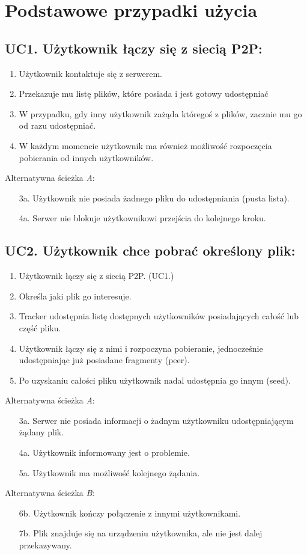 \documentclass[11pt]{article}
\begin{document}
\section{Podstawowe przypadki użycia}
\subsection{UC1. Użytkownik łączy się z siecią P2P:}
\begin{enumerate}
	\item Użytkownik kontaktuje się z serwerem.
	\item Przekazuje mu listę plików, które posiada i jest gotowy udostępniać
	\item W przypadku, gdy inny użytkownik zażąda któregoś z plików, zacznie mu go od razu udostępniać.
	\item W każdym momencie użytkownik ma również możliwość rozpoczęcia pobierania od innych użytkowników.
\end{enumerate}
Alternatywna ścieżka \textsl{A}:
\begin{itemize}
	\item [3a.] Użytkownik nie posiada żadnego pliku do udostępniania (pusta lista).
	\item [4a.] Serwer nie blokuje użytkownikowi przejścia do kolejnego kroku.
\end{itemize}
\subsection{UC2. Użytkownik chce pobrać określony plik:}
\begin{enumerate}
	\item Użytkownik łączy się z siecią P2P. (UC1.)
	\item Określa jaki plik go interesuje.
	\item Tracker udostępnia listę dostępnych użytkowników posiadających całość lub część pliku.
	\item Użytkownik łączy się z nimi i rozpoczyna pobieranie, jednocześnie udostępniając już posiadane fragmenty (peer).
	\item Po uzyskaniu całości pliku użytkownik nadal udostępnia go innym (seed).

\end{enumerate}
Alternatywna ścieżka \textsl{A}:
\begin{itemize}
	\item [3a.] Serwer nie posiada informacji o żadnym użytkowniku udostępniającym żądany plik.
	\item [4a.] Użytkownik informowany jest o problemie.
	\item [5a.] Użytkownik ma możliwość kolejnego żądania.
\end{itemize}
Alternatywna ścieżka \textsl{B}:
\begin{itemize}
	\item [6b.] Użytkownik kończy połączenie z innymi użytkownikami.
	\item [7b.] Plik znajduje się na urządzeniu użytkownika, ale nie jest dalej przekazywany.
\end{itemize}
\end{document}
